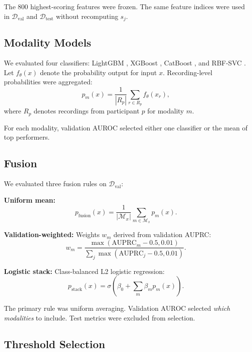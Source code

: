 \documentclass[conference]{IEEEtran}
\begin{document}
The 800 highest-scoring features were frozen. The same feature indices were used in $\mathcal{D}_{\text{val}}$ and $\mathcal{D}_{\text{test}}$ without recomputing $s_j$.

\subsection{Modality Models}

We evaluated four classifiers: LightGBM \cite{ke2017lightgbm}, XGBoost \cite{chen2016xgboost}, CatBoost \cite{prokhorenkova2018catboost}, and RBF-SVC \cite{cortes1995svm}. Let $f_\theta(x)$ denote the probability output for input $x$. Recording-level probabilities were aggregated:
\begin{equation}
p_m(x) = \frac{1}{|R_p|} \sum_{r \in R_p} f_\theta(x_r),
\end{equation}
where $R_p$ denotes recordings from participant $p$ for modality $m$.

For each modality, validation AUROC selected either one classifier or the mean of top performers.

\subsection{Fusion}

We evaluated three fusion rules on $\mathcal{D}_{\text{val}}$:

\textbf{Uniform mean:}
\begin{equation}
p_{\text{fusion}}(x) = \frac{1}{|\mathcal{M}_x|} \sum_{m \in \mathcal{M}_x} p_m(x).
\end{equation}

\textbf{Validation-weighted:} Weights $w_m$ derived from validation AUPRC:
\begin{equation}
w_m = \frac{\max(\text{AUPRC}_m - 0.5, 0.01)}{\sum_j \max(\text{AUPRC}_j - 0.5, 0.01)}.
\end{equation}

\textbf{Logistic stack:} Class-balanced L2 logistic regression:
\begin{equation}
p_{\text{stack}}(x) = \sigma\left(\beta_0 + \sum_m \beta_m p_m(x)\right).
\end{equation}

The primary rule was uniform averaging. Validation AUROC selected \emph{which modalities} to include. Test metrics were excluded from selection.

\subsection{Threshold Selection}
\end{document}
